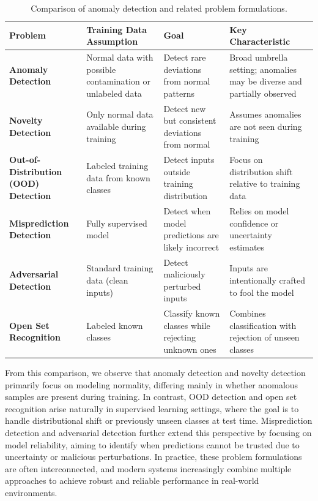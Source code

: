 \documentclass{article}
\begin{document}
\begin{table}[H]
\centering
\begin{tabular}{|p{3cm}|p{3.5cm}|p{3.5cm}|p{3.5cm}|}
\hline
\textbf{Problem} & \textbf{Training Data Assumption} & \textbf{Goal} & \textbf{Key Characteristic} \\
\hline

\textbf{Anomaly Detection} 
& Normal data with possible contamination or unlabeled data 
& Detect rare deviations from normal patterns 
& Broad umbrella setting; anomalies may be diverse and partially observed  \\
\hline

\textbf{Novelty Detection} 
& Only normal data available during training 
& Detect new but consistent deviations from normal 
& Assumes anomalies are not seen during training \\
\hline

\textbf{Out-of-Distribution (OOD) Detection} 
& Labeled training data from known classes 
& Detect inputs outside training distribution 
& Focus on distribution shift relative to training data \\
\hline

\textbf{Misprediction Detection} 
& Fully supervised model 
& Detect when model predictions are likely incorrect 
& Relies on model confidence or uncertainty estimates \\
\hline

\textbf{Adversarial Detection} 
& Standard training data (clean inputs) 
& Detect maliciously perturbed inputs 
& Inputs are intentionally crafted to fool the model \\
\hline

\textbf{Open Set Recognition} 
& Labeled known classes 
& Classify known classes while rejecting unknown ones 
& Combines classification with rejection of unseen classes \\
\hline

\end{tabular}
\caption{Comparison of anomaly detection and related problem formulations.}
\label{tab:anomaly_related_tasks}
\end{table}

From this comparison, we observe that anomaly detection and novelty detection primarily focus on modeling normality, differing mainly in whether anomalous samples are present during training. In contrast, OOD detection and open set recognition arise naturally in supervised learning settings, where the goal is to handle distributional shift or previously unseen classes at test time. Misprediction detection and adversarial detection further extend this perspective by focusing on model reliability, aiming to identify when predictions cannot be trusted due to uncertainty or malicious perturbations. In practice, these problem formulations are often interconnected, and modern systems increasingly combine multiple approaches to achieve robust and reliable performance in real-world environments.
\end{document}
